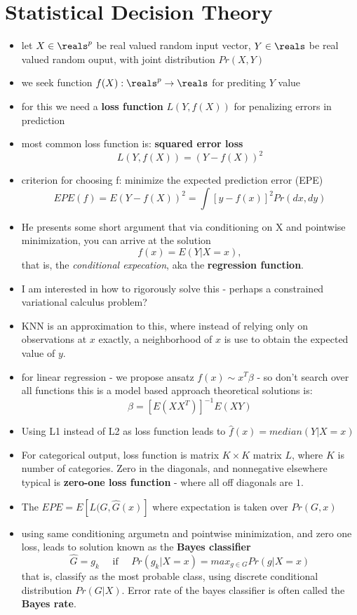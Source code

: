 \section{Statistical Decision Theory}
\begin{itemize}
  \item let $X \in \reals^p$ be real valued random input vector, $Y \in \reals$ be real valued random ouput, with joint distribution $Pr(X,Y)$
  \item we seek function $f(X):\reals^p \to \reals$ for prediting $Y$ value
  \item for this we need a {\bf loss function} $L(Y, f(X))$ for penalizing errors in prediction
  \item most common loss function is: {\bf squared error loss} 
    $$ L(Y, f(X)) = (Y - f(X))^2 $$
  \item criterion for choosing f: minimize the expected prediction error (EPE)
    $$ EPE(f) = E(Y-f(X))^2 = \int [y - f(x)]^2 Pr(dx,dy) $$
  \item He presents some short argument that via conditioning on X and pointwise minimization, you can arrive at the solution
    $$ f(x) = E(Y | X = x), $$
    that is, the \emph{conditional expecation}, aka the {\bf regression function}.
  \item {\color{gray} I am interested in how to rigorously solve this - perhaps a constrained variational calculus problem?}
  \item KNN is an approximation to this, where instead of relying only on observations at $x$ exactly, a neighborhood of $x$ is use to obtain the expected value of $y$.
  \item for linear regression - we propose ansatz $f(x) \sim x^T \beta$ -  so don't search over all functions
    \subitem this is a model based approach
    \subitem theoretical solutions is:
    $$ \beta = \left[ E(XX^T)\right]^{-1} E(XY) $$
  \item Using L1 instead of L2 as loss function leads to $ \hat{f}(x) = median(Y| X = x)$
  \item For categorical output, loss function is matrix $K\times K$ matrix $L$, where $K$ is number of categories. Zero in the diagonals, and nonnegative elsewhere
    \subitem typical is {\bf zero-one loss function} - where all off diagonals are $1$.
  \item The $EPE = E[L(G, \hat{G}(x)]$ where expectation is taken over $Pr(G, x)$
    \item using same conditioning argumetn and pointwise minimization, and zero one loss, leads to solution known as the {\bf Bayes classifier}
      $$ \hat{G} = g_k \quad \mbox{ if } \quad Pr(g_k | X = x) = max_{g \in G} Pr(g | X = x) $$
      that is, classify as the most probable class, using discrete conditional distribution $Pr(G|X)$.
      \subitem Error rate of the bayes classifier is often called the {\bf Bayes rate}.
\end{itemize}

